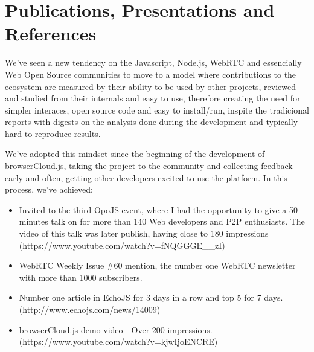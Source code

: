 \section{Publications, Presentations and References}

We've seen a new tendency on the Javascript, Node.js, WebRTC and essencially Web Open Source communities to move to a model where contributions to the ecosystem are measured by their ability to be used by other projects, reviewed and studied from their internals and easy to use, therefore creating the need for simpler interaces, open source code and easy to install/run, inspite the tradicional reports with digests on the analysis done during the development and typically hard to reproduce results.

We've adopted this mindset since the beginning of the development of browserCloud.js, taking the project to the community and collecting feedback early and often, getting other developers excited to use the platform. In this process, we've achieved:

\begin{itemize}
    \item Invited to the third OpoJS event, where I had the opportunity to give a 50 minutes talk on for more than 140 Web developers and P2P enthusiasts. The video of this talk was later publish, having close to 180 impressions (https://www.youtube.com/watch?v=fNQGGGE\_\_zI)
    \item WebRTC Weekly Issue \#60 mention, the number one WebRTC newsletter with more than 1000 subscribers.
    \item Number one article in EchoJS for 3 days in a row and top 5 for 7 days. (http://www.echojs.com/news/14009)
    \item browserCloud.js demo video - Over 200 impressions. (https://www.youtube.com/watch?v=kjwIjoENCRE)
\end{itemize}
